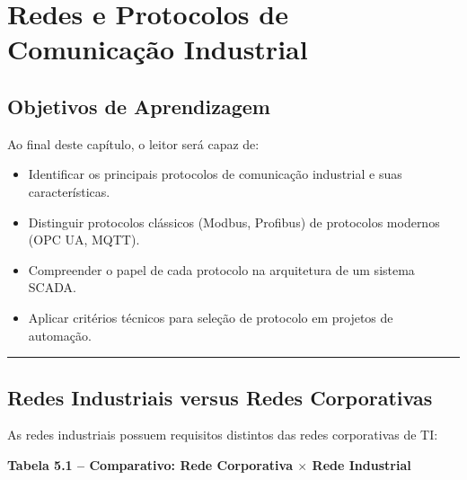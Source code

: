 \chapter{Redes e Protocolos de Comunicação Industrial}\label{redes-e-protocolos-de-comunicauxe7uxe3o-industrial}

\section*{Objetivos de Aprendizagem}

Ao final deste capítulo, o leitor será capaz de:

\begin{itemize}
\tightlist
\item
  Identificar os principais protocolos de comunicação industrial e suas características.
\item
  Distinguir protocolos clássicos (Modbus, Profibus) de protocolos modernos (OPC UA, MQTT).
\item
  Compreender o papel de cada protocolo na arquitetura de um sistema SCADA.
\item
  Aplicar critérios técnicos para seleção de protocolo em projetos de automação.
\end{itemize}

\begin{center}\rule{0.5\linewidth}{0.5pt}\end{center}

\section{Redes Industriais versus Redes Corporativas}\label{redes-industriais-versus-redes-corporativas}

As redes industriais possuem requisitos distintos das redes corporativas de TI:

\textbf{Tabela 5.1 -- Comparativo: Rede Corporativa \ensuremath{\times} Rede Industrial}

